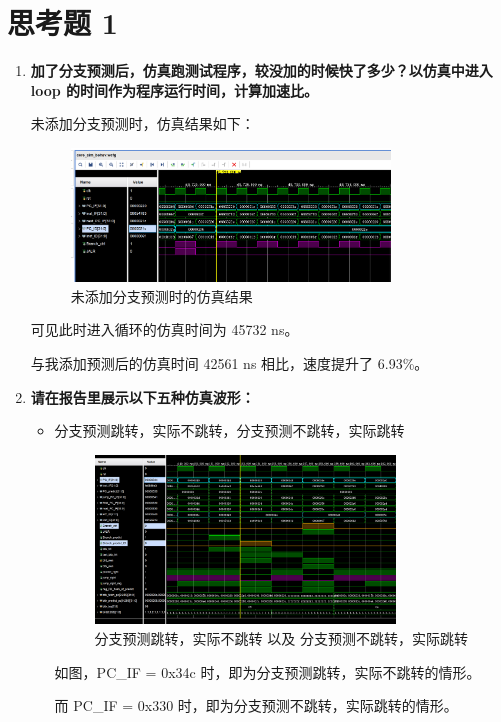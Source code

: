 \documentclass{article}
\begin{document}
\section{思考题 1}
\begin{enumerate}
    \item \textbf{加了分支预测后，仿真跑测试程序，较没加的时候快了多少？以仿真中进入 loop 的时间作为程序运行时间，计算加速比。}\par
    未添加分支预测时，仿真结果如下：\par
    \begin{figure}[h]
        \centering
        \includegraphics[width=0.8\textwidth]{image/sim_no_prediction.png}
        \caption{未添加分支预测时的仿真结果}
    \end{figure}
    可见此时进入循环的仿真时间为 45732 ns。\par
    与我添加预测后的仿真时间 42561 ns 相比，速度提升了 6.93\%。\par

    \newpage
    \item \textbf{请在报告里展示以下五种仿真波形：}\par
    \begin{itemize}
        \item 分支预测跳转，实际不跳转，分支预测不跳转，实际跳转\par
        \begin{figure}[h]
            \centering
            \includegraphics[width=0.8\textwidth]{image/thinking2_fig1.png}
            \caption{分支预测跳转，实际不跳转 以及 分支预测不跳转，实际跳转}
        \end{figure}
        如图，PC\_IF = 0x34c 时，即为分支预测跳转，实际不跳转的情形。\par
        而 PC\_IF = 0x330 时，即为分支预测不跳转，实际跳转的情形。\par


\end{itemize}
\end{enumerate}
\end{document}
